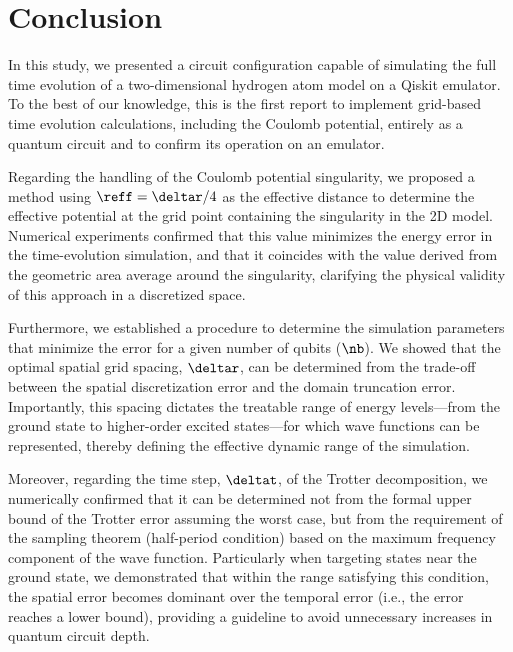 \documentclass[aip, adv, amsmath, amssymb, reprint]{revtex4-1}
\begin{document}

\section{Conclusion}
In this study, we presented a circuit configuration capable of simulating the
full time evolution of a two-dimensional hydrogen atom model on a Qiskit
emulator. To the best of our knowledge, this is the first report to implement
grid-based time evolution calculations, including the Coulomb potential,
entirely as a quantum circuit and to confirm its operation on an emulator.

Regarding the handling of the Coulomb potential singularity, we proposed a
method using $\reff=\deltar/4$ as the effective distance to determine the
effective potential at the grid point containing the singularity in the 2D
model. Numerical experiments confirmed that this value minimizes the
energy error in the time-evolution simulation, and that it coincides with
the value derived from the geometric area average around the singularity,
clarifying the physical validity of this approach in a discretized space.

Furthermore, we established a procedure to determine the simulation parameters
that minimize the error for a given number of qubits ($\nb$). We showed that the
optimal spatial grid spacing, $\deltar$, can be determined from the trade-off
between the spatial discretization error and the domain truncation error.
Importantly, this spacing dictates the treatable range of
energy levels---from the ground state to higher-order excited states---for which
wave functions can be represented, thereby defining the effective dynamic range
of the simulation.

Moreover, regarding the time step, $\deltat$, of the Trotter decomposition, we
numerically confirmed that it can be determined not from the formal upper bound
of the Trotter error assuming the worst case, but from the requirement of the
sampling theorem (half-period condition) based on the maximum frequency
component of the wave function. Particularly when targeting states near the
ground state, we demonstrated that within the range satisfying this condition,
the spatial error becomes dominant over the temporal error (i.e., the error
reaches a lower bound), providing a guideline to avoid unnecessary increases in
quantum circuit depth.
\end{document}
